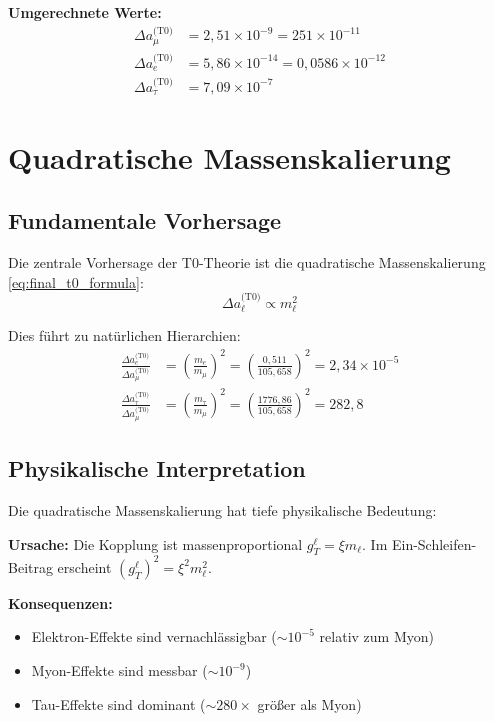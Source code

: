 	\textbf{Umgerechnete Werte:}
	\begin{align}
		\Delta a_\mu^{\text{(T0)}} &= 2{,}51 \times 10^{-9} = 251 \times 10^{-11} \label{eq:muon_conventional} \\
		\Delta a_e^{\text{(T0)}} &= 5{,}86 \times 10^{-14} = 0{,}0586 \times 10^{-12} \label{eq:electron_conventional} \\
		\Delta a_\tau^{\text{(T0)}} &= 7{,}09 \times 10^{-7} \label{eq:tau_conventional}
	\end{align}
	
	\section{Quadratische Massenskalierung}
	
	\subsection{Fundamentale Vorhersage}
	
	Die zentrale Vorhersage der T0-Theorie ist die quadratische Massenskalierung \eqref{eq:final_t0_formula}:
	\begin{equation}
		\Delta a_\ell^{\text{(T0)}} \propto m_\ell^2
		\label{eq:quadratic_scaling}
	\end{equation}
	
	Dies führt zu natürlichen Hierarchien:
	\begin{align}
		\frac{\Delta a_e^{\text{(T0)}}}{\Delta a_\mu^{\text{(T0)}}} 
		&= \left(\frac{m_e}{m_\mu}\right)^2 
		= \left(\frac{0{,}511}{105{,}658}\right)^2 
		= 2{,}34 \times 10^{-5} \label{eq:electron_muon_ratio} \\
		\frac{\Delta a_\tau^{\text{(T0)}}}{\Delta a_\mu^{\text{(T0)}}} 
		&= \left(\frac{m_\tau}{m_\mu}\right)^2 
		= \left(\frac{1776{,}86}{105{,}658}\right)^2 
		= 282{,}8 \label{eq:tau_muon_ratio}
	\end{align}
	
	\subsection{Physikalische Interpretation}
	
	Die quadratische Massenskalierung hat tiefe physikalische Bedeutung:
	
	\textbf{Ursache:} Die Kopplung ist massenproportional $g_T^\ell = \xi m_\ell$. Im Ein-Schleifen-Beitrag erscheint $(g_T^\ell)^2 = \xi^2 m_\ell^2$.
	
	\textbf{Konsequenzen:}
	\begin{itemize}
		\item Elektron-Effekte sind vernachlässigbar ($\sim 10^{-5}$ relativ zum Myon)
		\item Myon-Effekte sind messbar ($\sim 10^{-9}$)
		\item Tau-Effekte sind dominant ($\sim 280 \times$ größer als Myon)
	\end{itemize}
	
